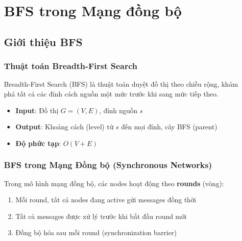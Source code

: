 \chapter{BFS trong Mạng đồng bộ}
\label{chap:bfs}

\section{Giới thiệu BFS}

\subsection{Thuật toán Breadth-First Search}

Breadth-First Search (BFS) là thuật toán duyệt đồ thị theo chiều rộng, khám phá tất cả các đỉnh cách nguồn một mức trước khi sang mức tiếp theo.

\begin{itemize}
    \item \textbf{Input}: Đồ thị $G = (V, E)$, đỉnh nguồn $s$
    \item \textbf{Output}: Khoảng cách (level) từ $s$ đến mọi đỉnh, cây BFS (parent)
    \item \textbf{Độ phức tạp}: $O(V + E)$
\end{itemize}

\subsection{BFS trong Mạng Đồng bộ (Synchronous Networks)}

Trong mô hình mạng đồng bộ, các nodes hoạt động theo \textbf{rounds} (vòng):

\begin{enumerate}
    \item Mỗi round, tất cả nodes đang active gửi messages đồng thời
    \item Tất cả messages được xử lý trước khi bắt đầu round mới
    \item Đồng bộ hóa sau mỗi round (synchronization barrier)
\end{enumerate}

